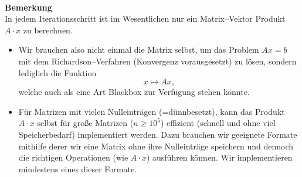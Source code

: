 ~\\
\textbf{Bemerkung}\\
In jedem Iterationsschritt ist im Wesentlichen nur ein Matrix--Vektor Produkt $A\cdot x$ zu berechnen.
\begin{itemize}
	\item Wir brauchen also nicht einmal die Matrix selbst, um das Problem $Ax =b $ mit dem Richardson--Verfahren (Konvergenz vorausgesetzt) zu lösen, sondern lediglich die Funktion $$x \mapsto Ax, $$
	welche auch als eine Art Blackbox zur Verfügung stehen könnte.
	\item Für Matrizen mit vielen Nulleinträgen (=dünnbesetzt), kann das Produkt $A\cdot x$ selbst für große Matrizen ($n \geq 10^5$) effizient (schnell und ohne viel Speicherbedarf) implementiert werden. Dazu brauchen wir geeignete Formate mithilfe derer wir eine Matrix ohne ihre Nulleinträge speichern und dennoch die richtigen Operationen (wie $A\cdot x$) ausführen können. Wir implementieren mindestens eines dieser Formate.
\end{itemize}

